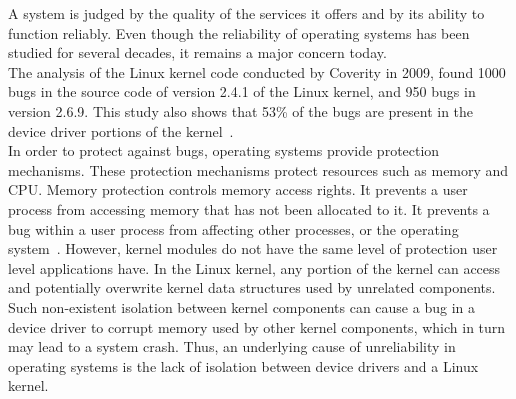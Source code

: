 A system is judged by the quality of the services it offers and by its ability to function reliably. Even though the reliability of operating systems has been studied for several decades, it remains a major concern today.
\\[3mm]
The analysis of the Linux kernel code conducted by Coverity in 2009, found 1000 bugs in the source code of version 2.4.1 of the Linux kernel, and 950 bugs in version 2.6.9. This study also shows that 53\% of the bugs are present in the device driver portions of the kernel~\cite{coveritykernel}. 
\\[3mm]
In order to protect against bugs, operating systems provide protection mechanisms. These protection mechanisms protect resources such as memory and CPU.
Memory protection controls memory access rights. It prevents a user process from accessing memory that has not been allocated to it. It prevents a bug within a user process from affecting other processes, or the operating system~\cite{denning1970virtual, Galvin}. However, kernel modules do not have the same level of protection user level applications have. In the Linux kernel, any portion of the kernel can access and potentially overwrite kernel data structures used by unrelated components. Such non-existent isolation between kernel components can cause a bug in a device driver to corrupt memory used by other kernel components, which in turn may lead to a system crash. Thus, an underlying cause of unreliability in operating systems is the lack of isolation between device drivers and a Linux kernel.

